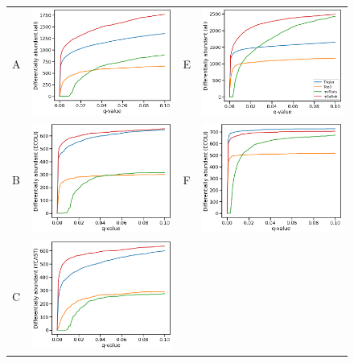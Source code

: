 \documentclass[10pt,letterpaper]{article}
\begin{document}
\begin{figure}[hbt]
    \centering
    \begin{tabular}{lclc} 
        A & \includegraphics[width=0.4\linewidth]{../../result/report_plots/osw_de_all.png} & 
        E & \includegraphics[width=0.4\linewidth]{../../result/report_plots/diann_de_all.png} \\ 
        B & \includegraphics[width=0.4\linewidth]{../../result/report_plots/osw_de_ecoli.png} & 
        F & \includegraphics[width=0.4\linewidth]{../../result/report_plots/diann_de_ecoli.png} \\ 
        C & \includegraphics[width=0.4\linewidth]{../../result/report_plots/osw_de_yeast.png} & 

\end{tabular}
\end{figure}
\end{document}

